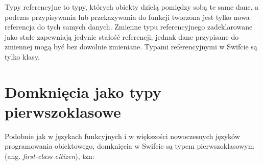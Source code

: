 \documentclass[mgr, shortabstract]{iithesis}
\newcommand{\ang}[1]{ang. \textit{#1}}
\begin{document}
Typy referencyjne to typy, których obiekty dzielą pomiędzy sobą te same dane, a podczas przypisywania lub przekazywania do funkcji tworzona jest tylko nowa referencja do tych samych danych. Zmienne typu referencyjnego zadeklarowane jako stałe zapewniają jedynie stałość referencji, jednak dane przypisane do zmiennej mogą być bez dowolnie zmieniane. Typami referencyjnymi w Swifcie są tylko klasy.

\section{Domknięcia jako typy pierwszoklasowe}

Podobnie jak w językach funkcyjnych i w większości nowoczesnych języków programowania obiektowego, domknięcia w Swifcie są typem pierwszoklasowym (\ang{first-class citizen}), tzn:
\end{document}
